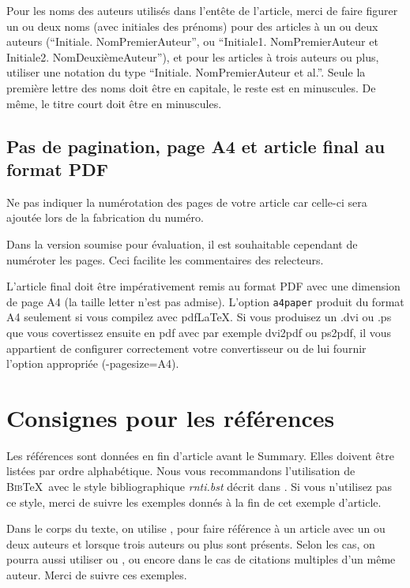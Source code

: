 \documentclass[a4paper,pagenum,french,showlayout]{rnti}
\begin{document}
Pour les noms des auteurs utilisés dans l'entête de l'article, merci
de faire figurer un ou deux noms (avec initiales des prénoms) pour
des articles à un ou deux auteurs (``Initiale. NomPremierAuteur'',
ou ``Initiale1. NomPremierAuteur et Initiale2. NomDeuxièmeAuteur''),
et pour les articles à trois auteurs ou plus, utiliser une notation
du type ``Initiale. NomPremierAuteur et al.''. Seule la première
lettre des noms doit être en capitale, le reste est en minuscules.
De même, le titre court doit être en minuscules.



\subsection{Pas de pagination, page A4 et article final au format PDF}

Ne pas indiquer la numérotation des pages de votre article car
celle-ci sera ajoutée lors de la fabrication du numéro.

Dans la version soumise pour évaluation, il est souhaitable
cependant de numéroter les pages. Ceci facilite les commentaires des
relecteurs.

L'article final doit être impérativement remis au format PDF avec
une dimension de page A4 (la taille letter n'est pas admise).
L'option \texttt{a4paper} produit du format A4 seulement si vous
compilez avec pdf\LaTeX{}. Si vous produisez un .dvi ou .ps que vous
covertissez ensuite en pdf avec par exemple dvi2pdf ou ps2pdf, il
vous appartient de configurer correctement votre convertisseur ou de
lui fournir l'option appropriée (-pagesize=A4).


\section{Consignes pour les références}

Les références sont données en fin d'article avant le
\guilo{}Summary\guilf{}. Elles doivent être listées par ordre
alphabétique.  Nous vous recommandons l'utilisation de
\textsc{Bib}\TeX\ avec le style bibliographique \textit{rnti.bst}
décrit dans \citet{ritschard:2005rnti}. Si vous n'utilisez pas ce
style, merci de suivre les exemples donnés à la fin de cet exemple
d'article.

Dans le corps du texte, on utilise \citet{thSau00}, \citet{HolWil90}
pour faire référence à un article avec un ou deux auteurs et
\citet{lioni01} lorsque trois auteurs ou plus sont présents.  Selon
les cas, on pourra aussi utiliser \citep{thSau00} ou
\citep[voir][chapitre 4]{brei:frie:olsh:ston:1984}, ou encore
\citet{quin:1986ID3,quin:1993} dans le cas de citations multiples
d'un même auteur. Merci de suivre ces exemples.
\end{document}
